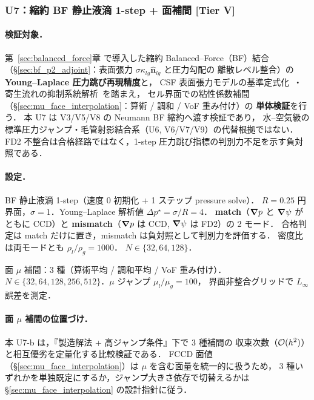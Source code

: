 %
\subsubsection{U7：縮約 BF 静止液滴 1-step + 面補間 [Tier V]}
\label{sec:U7_bf_static_droplet}

\paragraph{検証対象．}
第~\ref{sec:balanced_force}章 で導入した縮約 Balanced--Force（BF）結合~\cite{Francois2006}
（§\ref{sec:bf_p2_adjoint}：表面張力 $\sigma\kappa_{lg}\hat{\bm n}_{lg}$ と圧力勾配の
離散レベル整合）の \textbf{Young--Laplace 圧力跳び再現精度}と，
CSF 表面張力モデルの基準定式化~\cite{Brackbill1992}・寄生流れの抑制系統解析~\cite{Popinet2009,Renardy2002}を踏まえ，
セル界面での粘性係数補間（§\ref{sec:mu_face_interpolation}：算術 / 調和 / VoF 重み付け）の
\textbf{単体検証}を行う．
本 U7 は V3/V5/V8 の Neumann BF 縮約へ渡す検証であり，
水--空気級の標準圧力ジャンプ・毛管射影結合系（U6, V6/V7/V9）の代替根拠ではない．
FD2 不整合は合格経路ではなく，1-step 圧力跳び指標の判別力不足を示す負対照である．

\paragraph{設定．}
\begin{description}\setlength{\itemsep}{0pt}
  \item[U7-a] BF 静止液滴 1-step（速度 0 初期化 + 1 ステップ pressure solve）．
        $R=0.25$ 円界面，$\sigma = 1$．Young--Laplace 解析値 $\Delta p^\star = \sigma/R = 4$．
        \textbf{match}（$\bm{\nabla} p$ と $\bm{\nabla}\psi$ がともに CCD）と
        \textbf{mismatch}（$\bm{\nabla} p$ は CCD, $\bm{\nabla}\psi$ は FD2）の 2 モード．
        合格判定は match だけに置き，mismatch は負対照として判別力を評価する．
        密度比は両モードとも $\rho_l/\rho_g = 1000$．
        $N \in \{32,64,128\}$．
  \item[U7-b] 面 $\mu$ 補間：3 種（算術平均 / 調和平均 / VoF 重み付け）．
        $N \in \{32,64,128,256,512\}$．$\mu$ ジャンプ $\mu_l/\mu_g = 100$，
        界面非整合グリッドで $L_\infty$ 誤差を測定．
\end{description}

\paragraph{面 $\mu$ 補間の位置づけ．}
本 U7-b は，『製造解法 + 高ジャンプ条件』下で 3 種補間の
収束次数（$\mathcal{O}(h^2)$）と相互優劣を定量化する比較検証である．
FCCD 面値（§\ref{sec:mu_face_interpolation}）は
$\mu$ を含む面量を統一的に扱うため，
3 種いずれかを単独既定にするか，ジャンプ大きさ依存で切替えるかは
§\ref{sec:mu_face_interpolation} の設計指針に従う．

